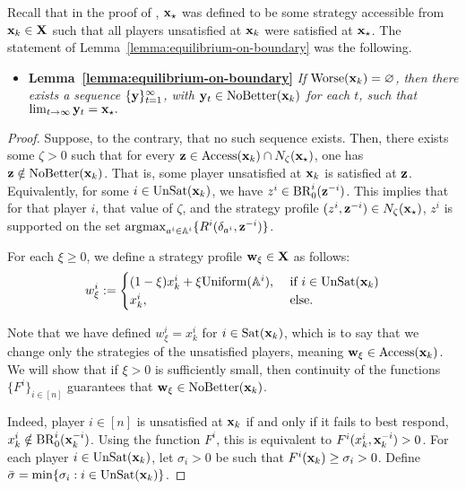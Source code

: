 Recall that in the proof of , ${\mathbf{x}}_{\star}$ was defined to be some strategy accessible from ${\mathbf{x}}_k \in {\mathbf{X}}$ such that all players unsatisfied at ${\mathbf{x}}_k$ were satisfied at ${\mathbf{x}}_{\star}$. The statement of Lemma~\ref{lemma:equilibrium-on-boundary} was the following.
\begin{itemize}
    \item[] \textbf{Lemma~\ref{lemma:equilibrium-on-boundary}} \textit{If ${\rm Worse}( {\mathbf{x}}_k ) = \varnothing$, then there exists a sequence $\{ {\mathbf{y}} \}_{t = 1}^{\infty}$, with ${\mathbf{y}}_t \in {\rm NoBetter}({\mathbf{x}}_k)$ for each $t$, such that $     \lim_{t \to \infty} {\mathbf{y}}_t = {\mathbf{x}}_{\star}. $ }
\end{itemize}


\begin{proof}
Suppose, to the contrary, that no such sequence exists. Then, there exists some $\zeta > 0$ such that for every ${\mathbf{z}} \in {\rm Access}({\mathbf{x}}_k)  \cap N_{\zeta} ( {\mathbf{x}}_{\star} )$, one has ${\mathbf{z}} \notin {\rm NoBetter}( {\mathbf{x}}_k )$. That is, some player unsatisfied at ${\mathbf{x}}_k$ is satisfied at ${\mathbf{z}}$. Equivalently, for some $i \in {\rm UnSat}({\mathbf{x}}_k)$, we have $z^i \in {\rm BR}^i_0 ( {\mathbf{z}}^{-i})$. This implies that for that player $i$, that value of $\zeta$, and the strategy profile $(z^i, {\mathbf{z}}^{-i}) \in N_{\zeta}({\mathbf{x}}_{\star})$, $z^i$ is supported on the set ${\rm argmax}_{a^i \in \mathbb{A}^i} \{ R^i ( \delta_{a^i} , {\mathbf{z}}^{-i} ) \}$.

For each $\xi \geq 0$, we define a strategy profile ${\mathbf{w}}_{\xi} \in {\mathbf{X}}$ as follows:
\[
w^i_{\xi} := 
    \begin{cases} 
        (1 - \xi) x^i_k + \xi {\rm Uniform} ( \mathbb{A}^i ),   &\text{ if } i \in {\rm UnSat}({\mathbf{x}}_k) \\
        x^i_k,                                      &\text{ else.}
    \end{cases}
\]

{
Note that we have defined $w^i_{\xi} = x^i_k$ for $i \in {\rm Sat}({\mathbf{x}}_k)$, which is to say that we change only the strategies of the unsatisfied players, meaning ${\mathbf{w}}_{\xi} \in {\rm Access}( {\mathbf{x}}_k )$. We will show that if $\xi > 0$ is sufficiently small, then continuity of the functions $\{ F^i \}_{i \in [n] }$ guarantees that ${\mathbf{w}}_{\xi} \in {\rm NoBetter}({\mathbf{x}}_k)$.

Indeed, player $i \in [n]$ is unsatisfied at ${\mathbf{x}}_k$ if and only if it fails to best respond, $x^i_k \notin {\rm BR}^i_0 ( {\mathbf{x}}^{-i}_k )$.  Using the function $F^i$, this is equivalent to $F^i ( x^i_k, {\mathbf{x}}^{-i}_k )  > 0 $. For each player $i \in {\rm UnSat}( {\mathbf{x}}_k )$, let $\sigma_i > 0 $ be such that $F^i ( {\mathbf{x}}_k ) \geq \sigma_i > 0 $. Define $\bar{\sigma} = \min\{ \sigma_i : i \in {\rm UnSat}({\mathbf{x}}_k ) \}$. 

}
\end{proof}
